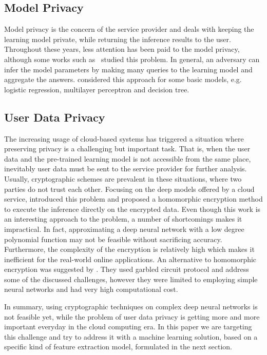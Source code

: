 \documentclass[10pt,journal,compsoc]{IEEEtran}
\begin{document}
\subsection{Model Privacy}

Model privacy is the concern of the service provider and deals with keeping the learning model private, while returning the inference results to the user. Throughout these years, less attention has been paid to the model privacy, although some works such as~\cite{tramer2016stealing} studied this problem. In general, an adversary can infer the model parameters by making many queries to the learning model and aggregate the answers. \cite{tramer2016stealing} considered this approach for some basic models, e.g. logistic regression, multilayer perceptron and decision tree. 

\subsection{User Data Privacy}

The increasing usage of cloud-based systems has triggered a situation where preserving privacy is a challenging but important task. That is, when the user data and the pre-trained learning model is not accessible from the same place, inevitably user data must be sent to the service provider for further analysis. Usually, cryptographic schemes are prevalent in these situations, where two parties do not trust each other. Focusing on the deep models offered by a cloud service, \cite{gilad2016} introduced this problem and proposed a homomorphic encryption method to execute the inference directly on the encrypted data. Even though this work is an interesting approach to the problem, a number of shortcomings makes it impractical. In fact, approximating a deep neural network with a low degree polynomial function may not be feasible without sacrificing accuracy. Furthermore, the complexity of the encryption is relatively high which makes it inefficient for the real-world online applications. %
An alternative to homomorphic encryption was suggested by \cite{rouhani2017}. They used garbled circuit protocol and address some of the discussed challenges, however they were limited to employing simple neural networks and had very high computational cost. 

In summary, using cryptographic techniques on complex deep neural networks is not feasible yet, while the problem of user data privacy is getting more and more important everyday in the cloud computing era. In this paper we are targeting this challenge and try to address it with a machine learning solution, based on a specific kind of feature extraction model, formulated in the next section.
\end{document}
